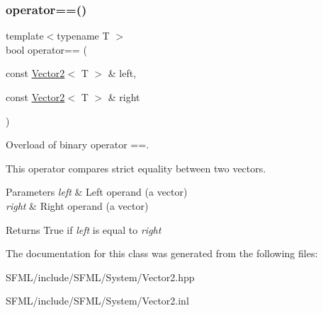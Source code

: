 \subsubsection{\texorpdfstring{operator==()}{operator==()}}
{\footnotesize\ttfamily template$<$typename T $>$ \\
bool operator== (\begin{DoxyParamCaption}\item[{const \mbox{\hyperlink{classsf_1_1_vector2}{Vector2}}$<$ T $>$ \&}]{left,  }\item[{const \mbox{\hyperlink{classsf_1_1_vector2}{Vector2}}$<$ T $>$ \&}]{right }\end{DoxyParamCaption})\hspace{0.3cm}{\ttfamily [related]}}



Overload of binary operator ==. 

This operator compares strict equality between two vectors.


\begin{DoxyParams}{Parameters}
{\em left} & Left operand (a vector) \\
\hline
{\em right} & Right operand (a vector)\\
\hline
\end{DoxyParams}
\begin{DoxyReturn}{Returns}
True if {\itshape left} is equal to {\itshape right} \begin{DoxyVerb}\end{DoxyVerb}
 
\end{DoxyReturn}


The documentation for this class was generated from the following files\+:\begin{DoxyCompactItemize}
\item 
S\+F\+M\+L/include/\+S\+F\+M\+L/\+System/Vector2.\+hpp\item 
S\+F\+M\+L/include/\+S\+F\+M\+L/\+System/Vector2.\+inl\end{DoxyCompactItemize}
